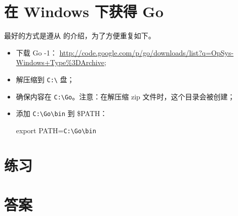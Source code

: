 \section{在 Windows 下获得 Go}

最好的方式是遵从 \cite{go_install} 的介绍，为了方便重复如下。

\begin{itemize}
\item 下载 Go -1：
\url{http://code.google.com/p/go/downloads/list?q=OpSys-Windows+Type%3DArchive};
\item 解压缩到 \verb|C:\| 盘；
\item 确保内容在 \verb|C:\Go|。注意：在解压缩 zip 文件时，这个目录会被创建；
\item 添加 \verb|C:\Go\bin| 到 \$PATH：
\begin{display}
export PATH=\verb|C:\Go\bin|
\end{display}
\end{itemize}

\section{练习}


\cleardoublepage
\section{答案}
\shipoutAnswer
